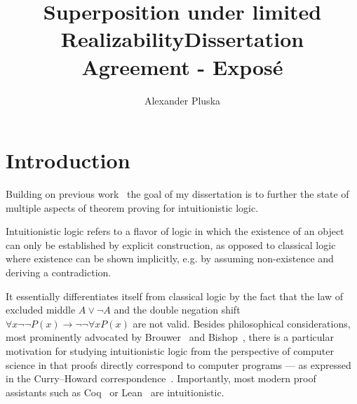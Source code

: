 \documentclass{article}
\title{Superposition under limited Realizability}
\author{Alexander Pluska}
\title{Dissertation Agreement - Exposé}
\theoremstyle{definition}
\theoremstyle{definition}
\theoremstyle{definition}
\theoremstyle{definition}
\theoremstyle{definition}
\theoremstyle{definition}
\theoremstyle{definition}
\newcommand{\0}{\mathbf 0}
\newcommand{\1}{\mathbf 1}
\begin{document}
	

	\maketitle

	\section{Introduction}
	
	Building on previous work~\cite{thesis,pluska2023embedding} the goal of my dissertation is to further the state of multiple aspects of theorem proving for intuitionistic logic.

	Intuitionistic logic refers to a flavor of logic in which the existence of an object can only be established by explicit construction, as opposed to classical logic where existence can be shown implicitly, e.g. by assuming non-existence and deriving a contradiction.

	It essentially differentiates itself from classical logic by the fact that the law of excluded middle $A\vee\neg A$ and the double negation shift $\forall x\neg\neg P(x)\to\neg\neg\forall xP(x)$ are not valid.
	Besides philosophical considerations, most prominently advocated by Brouwer~\cite{brouwer1907over} and Bishop~\cite{bishop1967foundations}, there is a particular motivation for studying intuitionistic logic from the perspective of computer science in that proofs directly correspond to computer programs --- as expressed in the Curry--Howard correspondence~\cite{howard1980formulae}. Importantly, most modern proof assistants such as Coq~\cite{bertot2013interactive} or Lean~\cite{de2015lean} are intuitionistic.
\end{document}
